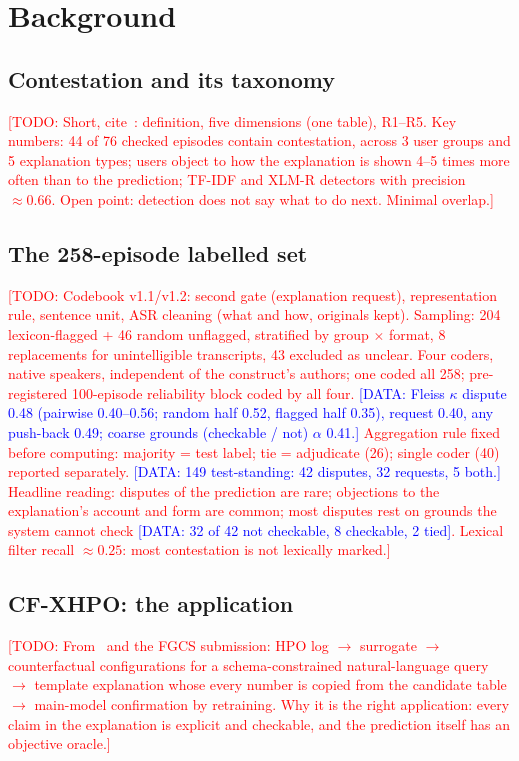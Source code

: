 \documentclass[preprint,12pt,3p,times]{elsarticle}
\newcommand{\todo}[1]{\textcolor{red}{[TODO: #1]}}
\newcommand{\done}[1]{\textcolor{blue}{[DATA: #1]}}   %
\begin{document}
\section{Background}
\subsection{Contestation and its taxonomy}
\todo{Short, cite~\cite{phase1}: definition, five dimensions (one table), R1--R5. Key numbers: 44 of 76 checked episodes contain contestation, across 3 user groups and 5 explanation types; users object to how the explanation is shown 4--5 times more often than to the prediction; TF-IDF and XLM-R detectors with precision $\approx 0.66$. Open point: detection does not say what to do next. Minimal overlap.}
\subsection{The 258-episode labelled set}  %
\todo{Codebook v1.1/v1.2: second gate (explanation request), representation rule, sentence unit, ASR cleaning (what and how, originals kept). Sampling: 204 lexicon-flagged + 46 random unflagged, stratified by group $\times$ format, 8 replacements for unintelligible transcripts, 43 excluded as unclear. Four coders, native speakers, independent of the construct's authors; one coded all 258; pre-registered 100-episode reliability block coded by all four. \done{Fleiss $\kappa$ dispute 0.48 (pairwise 0.40--0.56; random half 0.52, flagged half 0.35), request 0.40, any push-back 0.49; coarse grounds (checkable / not) $\alpha$ 0.41.} Aggregation rule fixed before computing: majority = test label; tie = adjudicate (26); single coder (40) reported separately. \done{149 test-standing: 42 disputes, 32 requests, 5 both.} Headline reading: disputes of the prediction are rare; objections to the explanation's account and form are common; most disputes rest on grounds the system cannot check \done{32 of 42 not checkable, 8 checkable, 2 tied}. Lexical filter recall $\approx 0.25$: most contestation is not lexically marked.}
\subsection{CF-XHPO: the application}
\todo{From~\cite{manai2026orders} and the FGCS submission: HPO log $\rightarrow$ surrogate $\rightarrow$ counterfactual configurations for a schema-constrained natural-language query $\rightarrow$ template explanation whose every number is copied from the candidate table $\rightarrow$ main-model confirmation by retraining. Why it is the right application: every claim in the explanation is explicit and checkable, and the prediction itself has an objective oracle.}
\end{document}
